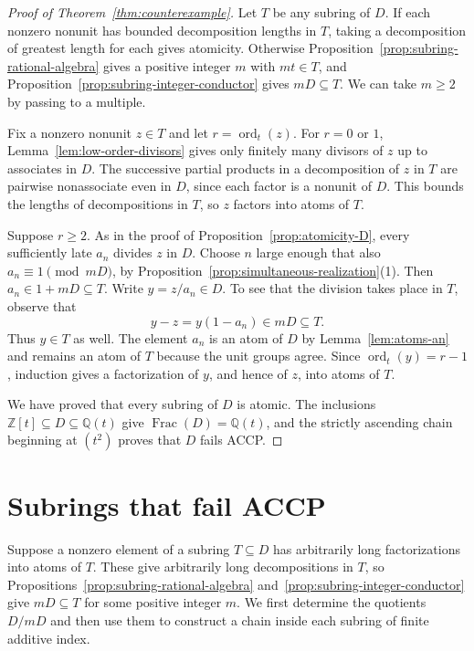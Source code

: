 \documentclass{article}
\DeclareMathOperator{\ord}{ord}
\theoremstyle{remark}
\begin{document}
\begin{proof}[Proof of Theorem~\ref{thm:counterexample}]
    Let $T$ be any subring of $D$.
    If each nonzero nonunit has bounded decomposition lengths in $T$, taking a decomposition of greatest length for each gives atomicity.
    Otherwise Proposition~\ref{prop:subring-rational-algebra} gives a positive integer $m$ with $mt \in T$, and Proposition~\ref{prop:subring-integer-conductor} gives $mD \subseteq T$.
    We can take $m \ge 2$ by passing to a multiple.

    Fix a nonzero nonunit $z \in T$ and let $r = \ord_t(z)$.
    For $r = 0$ or $1$, Lemma~\ref{lem:low-order-divisors} gives only finitely many divisors of $z$ up to associates in $D$.
    The successive partial products in a decomposition of $z$ in $T$ are pairwise nonassociate even in $D$, since each factor is a nonunit of $D$.
    This bounds the lengths of decompositions in $T$, so $z$ factors into atoms of $T$.

    Suppose $r \ge 2$.
    As in the proof of Proposition~\ref{prop:atomicity-D}, every sufficiently late $a_n$ divides $z$ in $D$.
    Choose $n$ large enough that also $a_n \equiv 1 \pmod{mD}$, by Proposition~\ref{prop:simultaneous-realization}(1).
    Then $a_n \in 1 + mD \subseteq T$.
    Write $y = z/a_n \in D$.
    To see that the division takes place in $T$, observe that
    \[
        y - z = y(1 - a_n) \in mD \subseteq T.
    \]
    Thus $y \in T$ as well.
    The element $a_n$ is an atom of $D$ by Lemma~\ref{lem:atoms-an} and remains an atom of $T$ because the unit groups agree.
    Since $\ord_t(y) = r - 1$, induction gives a factorization of $y$, and hence of $z$, into atoms of $T$.

    We have proved that every subring of $D$ is atomic.
    The inclusions $\mathbb{Z}[t] \subseteq D \subseteq \mathbb{Q}(t)$ give $\operatorname{Frac}(D) = \mathbb{Q}(t)$, and the strictly ascending chain beginning at $(t^2)$ proves that $D$ fails ACCP.
\end{proof}

\section{Subrings that fail ACCP}
\label{sec:subring-classification}

Suppose a nonzero element of a subring $T \subseteq D$ has arbitrarily long factorizations into atoms of $T$.
These give arbitrarily long decompositions in $T$, so Propositions~\ref{prop:subring-rational-algebra} and~\ref{prop:subring-integer-conductor} give $mD \subseteq T$ for some positive integer $m$.
We first determine the quotients $D/mD$ and then use them to construct a chain inside each subring of finite additive index.
\end{document}
